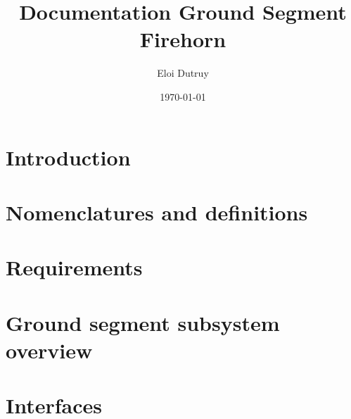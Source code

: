 \documentclass{article}
\title{Documentation Ground Segment Firehorn}
\author{Eloi Dutruy}
\date{\today}
\begin{document}
	
	
	\tableofcontents

	\newpage
	\section{Introduction}
	

	\newpage
	\section{Nomenclatures and definitions}
	

	\newpage
	\section{Requirements}
	

	\newpage
	\section{Ground segment subsystem overview}
	
	
	\newpage
	\section{Interfaces}
	
\end{document}

